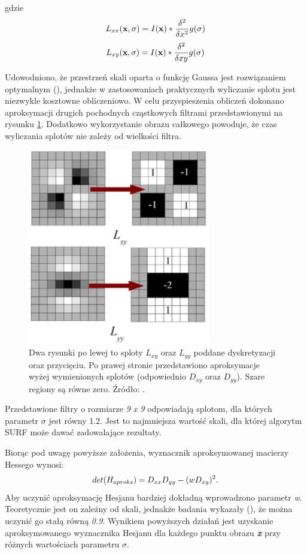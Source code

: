 gdzie 
\begin{equation}\textsl{}
L_{xx}(\textbf{x},\sigma) = I(\textbf{x})*\frac{\delta^2}{\delta x^2}g(\sigma)
\end{equation}
\begin{equation}\textsl{}
L_{xy}(\textbf{x},\sigma) = I(\textbf{x})*\frac{\delta^2}{\delta xy}g(\sigma)
\end{equation}

Udowodniono, że przestrzeń skali oparta o funkcję Gaussa jest rozwiązaniem optymalnym (\cite{SurfTemp1}), jednakże w zastosowaniach praktycznych wyliczanie splotu jest niezwykle kosztowne obliczeniowo. W celu przyspieszenia obliczeń dokonano aproksymacji drugich pochodnych cząstkowych filtrami przedstawionymi na rysunku \ref{im: GaussianApproximation}. Dodatkowo wykorzystanie obrazu całkowego powoduje, że czas wyliczania splotów nie zależy od wielkości filtra. 
\begin{figure}[h]
	\includegraphics[width=8cm]{SurfLxyLyy}
	\centering
	\caption{Dwa rysunki po lewej to sploty \textit{$L_{xy}$} oraz \textit{$L_{yy}$} poddane dyskretyzacji oraz przycięciu. Po prawej stronie przedstawiono aproksymacje wyżej wymienionych splotów (odpowiednio \textit{$D_{xy}$} oraz \textit{$D_{yy}$}). Szare regiony są równe zero. Źródło: \cite{Surf}.}
	\label{im: GaussianApproximation}
\end{figure}

Przedstawione filtry o rozmiarze \textit{9 x 9} odpowiadają splotom, dla których parametr $\sigma$ jest równy 1.2. Jest to najmniejsza wartość skali, dla której algorytm SURF może dawać zadowalające rezultaty.

Biorąc pod uwagę powyższe założenia, wyznacznik aproksymowanej macierzy Hessego wynosi:
\begin{equation}\textsl{}
det(H_{aproks}) = D_{xx}D_{yy} - (wD_{xy})^2.
\end{equation}
Aby uczynić aproksymację Hesjanu bardziej dokładną wprowadzono parametr \textit{w}. Teoretycznie jest on zależny od skali, jednakże badania wykazały (\cite{Surf}), że można uczynić go stałą równą \textit{0.9}.  
Wynikiem powyższych działań jest uzyskanie aproksymowanego wyznacznika Hesjanu dla każdego punktu obrazu \textit{\textbf{x}} przy różnych wartościach parametru $\sigma$.

